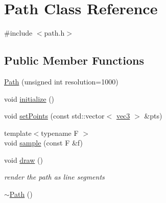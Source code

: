 \hypertarget{classPath}{}\section{Path Class Reference}
\label{classPath}


{\ttfamily \#include $<$path.\+h$>$}

\subsection*{Public Member Functions}
\begin{DoxyCompactItemize}
\item 
\hyperlink{classPath_a815c94272d3b7721815f70e82453358c}{Path} (unsigned int resolution=1000)
\item 
void \hyperlink{classPath_aa7416eac9bd0928062140e022b1f8bd3}{initialize} ()
\item 
void \hyperlink{classPath_aa591f2910de2b259d3fd3b94fc87d3f3}{set\+Points} (const std\+::vector$<$ \hyperlink{classvec3}{vec3} $>$ \&pts)
\item 
{\footnotesize template$<$typename F $>$ }\\void \hyperlink{classPath_acaabd7ad7669592f9885cdb09a434695}{sample} (const F \&f)
\item 
void \hyperlink{classPath_a44c5c139fada63bc08efe1fe28ca264a}{draw} ()
\begin{DoxyCompactList}\small\item\em render the path as line segments \end{DoxyCompactList}\item 
\hyperlink{classPath_a141da9ff89c85e0ba410b5a73864c267}{$\sim$\+Path} ()
\end{DoxyCompactItemize}
